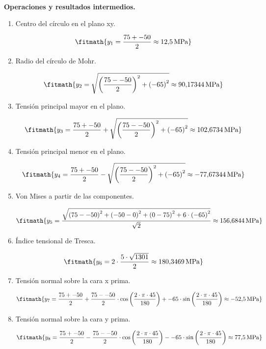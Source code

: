 \noindent\textbf{Operaciones y resultados intermedios.}

\begin{enumerate}

\item Centro del círculo en el plano xy.

\[\fitmath{y_{1}=\frac{75+-50}{2}\approx 12{,}5\,\mathrm{MPa}}\]

\item Radio del círculo de Mohr.

\[\fitmath{y_{2}=\sqrt{{\left(\frac{75--50}{2}\right)}^{2}+{\left(-65\right)}^{2}}\approx 90{,}17344\,\mathrm{MPa}}\]

\item Tensión principal mayor en el plano.

\[\fitmath{y_{3}=\frac{75+-50}{2}+\sqrt{{\left(\frac{75--50}{2}\right)}^{2}+{\left(-65\right)}^{2}}\approx 102{,}6734\,\mathrm{MPa}}\]

\item Tensión principal menor en el plano.

\[\fitmath{y_{4}=\frac{75+-50}{2}-\sqrt{{\left(\frac{75--50}{2}\right)}^{2}+{\left(-65\right)}^{2}}\approx -77{,}67344\,\mathrm{MPa}}\]

\item Von Mises a partir de las componentes.

\[\fitmath{y_{5}=\frac{\sqrt{{\left(75--50\right)}^{2}+{\left(-50-0\right)}^{2}+{\left(0-75\right)}^{2}+6\cdot {\left(-65\right)}^{2}}}{\sqrt{2}}\approx 156{,}6844\,\mathrm{MPa}}\]

\item Índice tensional de Tresca.

\[\fitmath{y_{6}=2\cdot \frac{5\cdot \sqrt{1301}}{2}\approx 180{,}3469\,\mathrm{MPa}}\]

\item Tensión normal sobre la cara x prima.

\[\fitmath{y_{7}=\frac{75+-50}{2}+\frac{75--50}{2}\cdot \cos\left(\frac{2\cdot \pi\cdot 45}{180}\right)+-65\cdot \sin\left(\frac{2\cdot \pi\cdot 45}{180}\right)\approx -52{,}5\,\mathrm{MPa}}\]

\item Tensión normal sobre la cara y prima.

\[\fitmath{y_{8}=\frac{75+-50}{2}-\frac{75--50}{2}\cdot \cos\left(\frac{2\cdot \pi\cdot 45}{180}\right)--65\cdot \sin\left(\frac{2\cdot \pi\cdot 45}{180}\right)\approx 77{,}5\,\mathrm{MPa}}\]


\end{enumerate}
